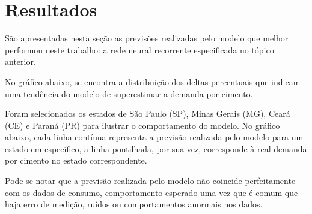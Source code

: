 
\chapter{Resultados}
\label{chap:resultados}

São apresentadas nesta seção as previsões realizadas pelo modelo que melhor 
performou neste trabalho: a rede neural recorrente especificada no tópico 
anterior.

No gráfico abaixo, se encontra a distribuição dos deltas percentuais 
que indicam uma tendência do modelo de superestimar a demanda por cimento.



Foram selecionados os estados de São Paulo (SP), Minas Gerais (MG), 
Ceará (CE) e Paraná (PR) para ilustrar o comportamento do modelo. 
No gráfico abaixo, cada linha contínua representa a previsão realizada 
pelo modelo para um estado em específico, a linha pontilhada, por sua vez, 
corresponde à real demanda por cimento no estado correspondente.


Pode-se notar que a previsão realizada pelo modelo não coincide perfeitamente 
com os dados de consumo, comportamento esperado uma vez que é comum que haja 
erro de medição, ruídos ou comportamentos anormais nos dados. 